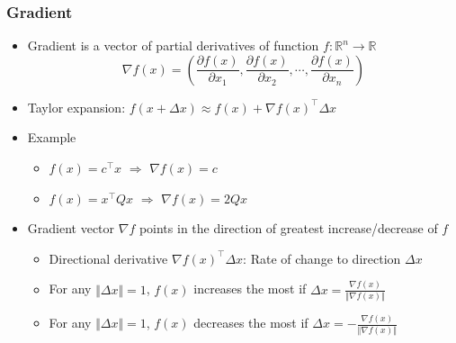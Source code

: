 \subsubsection*{Gradient}
\begin{itemize}
    \item Gradient is a vector of partial derivatives of function $f:\mathbb{R}^n\rightarrow\mathbb{R}$
    \begin{equation}
        \nabla f(x)=\left(\frac{\partial f(x)}{\partial x_1},\frac{\partial f(x)}{\partial x_2},\cdots,\frac{\partial f(x)}{\partial x_n}\right)
    \end{equation}
    \item Taylor expansion: $f(x + \Delta x) \approx f(x) + \nabla f(x)^{\top} \Delta x$
    \item Example
    \begin{itemize}
        \item $f(x)=c^{\top}x$ $\Rightarrow$ $\nabla f(x)=c$
        \item $f(x)=x^{\top}Qx$ $\Rightarrow$ $\nabla f(x)=2Qx$
    \end{itemize}
    \item Gradient vector $\nabla f$ points in the direction of greatest increase/decrease of $f$
    \begin{itemize}
        \item Directional derivative $\nabla f(x)^{\top}\Delta x$: Rate of change to direction $\Delta x$
        \item For any $\Vert\Delta x\Vert=1$, $f(x)$ increases the most if $\Delta x=\frac{\nabla f(x)}{\Vert\nabla f(x)\Vert}$
        \item For any $\Vert\Delta x\Vert=1$, $f(x)$ decreases the most if $\Delta x=-\frac{\nabla f(x)}{\Vert\nabla f(x)\Vert}$
    \end{itemize}
\end{itemize}

